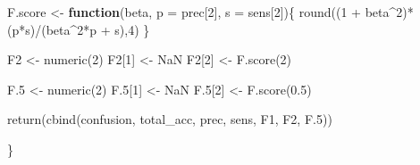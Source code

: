 \documentclass[a4paper, nobind]{templates/ociamthesis}
\newenvironment{Shaded}{\begin{snugshade}}{\end{snugshade}}
\newcommand{\AttributeTok}[1]{\textcolor[rgb]{0.77,0.63,0.00}{#1}}
\newcommand{\ConstantTok}[1]{\textcolor[rgb]{0.00,0.00,0.00}{#1}}
\newcommand{\ControlFlowTok}[1]{\textcolor[rgb]{0.13,0.29,0.53}{\textbf{#1}}}
\newcommand{\DecValTok}[1]{\textcolor[rgb]{0.00,0.00,0.81}{#1}}
\newcommand{\FloatTok}[1]{\textcolor[rgb]{0.00,0.00,0.81}{#1}}
\newcommand{\FunctionTok}[1]{\textcolor[rgb]{0.00,0.00,0.00}{#1}}
\newcommand{\NormalTok}[1]{#1}
\newcommand{\OtherTok}[1]{\textcolor[rgb]{0.56,0.35,0.01}{#1}}
\newcommand{\SpecialCharTok}[1]{\textcolor[rgb]{0.00,0.00,0.00}{#1}}
\renewenvironment{Shaded}
{
  \vspace{10pt}%
  \begin{snugshade}%
}{%
  \end{snugshade}%
  \vspace{8pt}%
}
\begin{document}
\begin{Shaded}
\begin{Highlighting}[]
\NormalTok{  F.score }\OtherTok{\textless{}{-}} \ControlFlowTok{function}\NormalTok{(beta, }\AttributeTok{p =}\NormalTok{ prec[}\DecValTok{2}\NormalTok{], }\AttributeTok{s =}\NormalTok{ sens[}\DecValTok{2}\NormalTok{])\{}
    \FunctionTok{round}\NormalTok{((}\DecValTok{1} \SpecialCharTok{+}\NormalTok{ beta}\SpecialCharTok{\^{}}\DecValTok{2}\NormalTok{)}\SpecialCharTok{*}\NormalTok{(p}\SpecialCharTok{*}\NormalTok{s)}\SpecialCharTok{/}\NormalTok{(beta}\SpecialCharTok{\^{}}\DecValTok{2}\SpecialCharTok{*}\NormalTok{p }\SpecialCharTok{+}\NormalTok{ s),}\DecValTok{4}\NormalTok{)}
\NormalTok{  \}}
  
\NormalTok{  F2 }\OtherTok{\textless{}{-}} \FunctionTok{numeric}\NormalTok{(}\DecValTok{2}\NormalTok{)}
\NormalTok{  F2[}\DecValTok{1}\NormalTok{] }\OtherTok{\textless{}{-}} \ConstantTok{NaN}
\NormalTok{  F2[}\DecValTok{2}\NormalTok{] }\OtherTok{\textless{}{-}} \FunctionTok{F.score}\NormalTok{(}\DecValTok{2}\NormalTok{)}
  
\NormalTok{  F}\FloatTok{.5} \OtherTok{\textless{}{-}} \FunctionTok{numeric}\NormalTok{(}\DecValTok{2}\NormalTok{)}
\NormalTok{  F}\FloatTok{.5}\NormalTok{[}\DecValTok{1}\NormalTok{] }\OtherTok{\textless{}{-}} \ConstantTok{NaN}
\NormalTok{  F}\FloatTok{.5}\NormalTok{[}\DecValTok{2}\NormalTok{] }\OtherTok{\textless{}{-}} \FunctionTok{F.score}\NormalTok{(}\FloatTok{0.5}\NormalTok{)}
  
  \FunctionTok{return}\NormalTok{(}\FunctionTok{cbind}\NormalTok{(confusion, total\_acc, prec, sens, F1, F2, F}\FloatTok{.5}\NormalTok{))}
  
\NormalTok{\}}
\end{Highlighting}
\end{Shaded}
\end{document}
